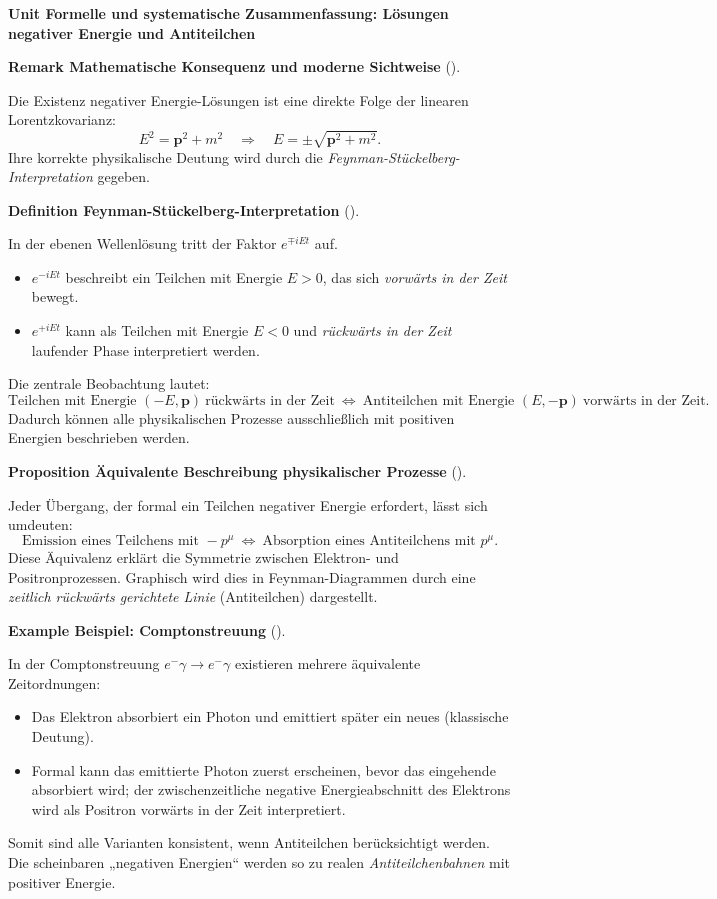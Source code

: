 \documentclass[10pt, letterpaper]{article}
\newcommand{\CustomHeading}[3]{%
  \par\medskip\noindent%
  \textbf{#1 #2} \textnormal{(#3)}.\enskip%
}
\newenvironment{DEF}[2]{\begin{unitbox}\CustomHeading{Definition}{#1}{#2}}{\end{unitbox}}
\newenvironment{PROP}[2]{\begin{unitbox}\CustomHeading{Proposition}{#1}{#2}}{\end{unitbox}}
\newenvironment{REM}[2]{\begin{unitbox}\CustomHeading{Remark}{#1}{#2}}{\end{unitbox}}
\newenvironment{EXA}[2]{\begin{unitbox}\CustomHeading{Example}{#1}{#2}}{\end{unitbox}}
\newenvironment{unit}[1]
  {\begin{unitbox}\textbf{Unit #1}\par\smallskip}
  {\end{unitbox}}
\begin{document}
\begin{unit}{Formelle und systematische Zusammenfassung: Lösungen negativer Energie und Antiteilchen}
\begin{REM}{Mathematische Konsequenz und moderne Sichtweise}{}
Die Existenz negativer Energie-Lösungen ist eine direkte Folge der linearen Lorentzkovarianz:
\[
E^2=\mathbf p^2+m^2\quad\Rightarrow\quad E=\pm\sqrt{\mathbf p^2+m^2}.
\]
Ihre korrekte physikalische Deutung wird durch die \emph{Feynman-Stückelberg-Interpretation} gegeben.
\end{REM}

\begin{DEF}{Feynman-Stückelberg-Interpretation}{}
In der ebenen Wellenlösung tritt der Faktor $e^{\mp iEt}$ auf.  
\begin{itemize}
\item $e^{-iEt}$ beschreibt ein Teilchen mit Energie $E>0$, das sich \emph{vorwärts in der Zeit} bewegt.
\item $e^{+iEt}$ kann als Teilchen mit Energie $E<0$ und \emph{rückwärts in der Zeit} laufender Phase interpretiert werden.
\end{itemize}
Die zentrale Beobachtung lautet:
\[
\boxed{
\text{Teilchen mit Energie } (-E,\mathbf p)
\ \text{rückwärts in der Zeit}\
\Longleftrightarrow\
\text{Antiteilchen mit Energie } (E,-\mathbf p)
\ \text{vorwärts in der Zeit.}
}
\]
Dadurch können alle physikalischen Prozesse ausschließlich mit positiven Energien beschrieben werden.
\end{DEF}

\begin{PROP}{Äquivalente Beschreibung physikalischer Prozesse}{}
Jeder Übergang, der formal ein Teilchen negativer Energie erfordert, lässt sich umdeuten:
\[
\text{Emission eines Teilchens mit } -p^\mu
\ \Longleftrightarrow\
\text{Absorption eines Antiteilchens mit } p^\mu.
\]
Diese Äquivalenz erklärt die Symmetrie zwischen Elektron- und Positronprozessen.  
Graphisch wird dies in Feynman-Diagrammen durch eine \emph{zeitlich rückwärts gerichtete Linie} (Antiteilchen) dargestellt.
\end{PROP}

\begin{EXA}{Beispiel: Comptonstreuung}{}
In der Comptonstreuung $e^-\gamma\to e^-\gamma$ existieren mehrere äquivalente Zeitordnungen:
\begin{itemize}
\item Das Elektron absorbiert ein Photon und emittiert später ein neues (klassische Deutung).
\item Formal kann das emittierte Photon zuerst erscheinen, bevor das eingehende absorbiert wird; der zwischenzeitliche negative Energieabschnitt des Elektrons wird als Positron vorwärts in der Zeit interpretiert.
\end{itemize}
Somit sind alle Varianten konsistent, wenn Antiteilchen berücksichtigt werden.  
Die scheinbaren „negativen Energien“ werden so zu realen \emph{Antiteilchenbahnen} mit positiver Energie.
\end{EXA}


\end{unit}
\end{document}
